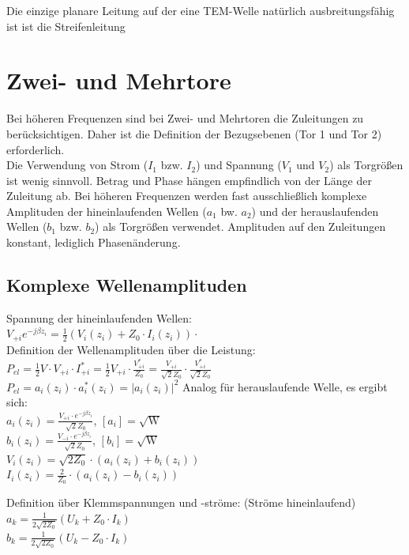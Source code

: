\documentclass[english]{latex4ei/latex4ei_sheet}
\begin{document}
\begin{sectionbox}
Die einzige planare Leitung auf der eine TEM-Welle natürlich ausbreitungsfähig ist ist die Streifenleitung

\end{sectionbox}

\section{Zwei- und Mehrtore}
\begin{sectionbox}
Bei höheren Frequenzen sind bei Zwei- und Mehrtoren die Zuleitungen zu berücksichtigen. Daher ist die Definition der Bezugsebenen (Tor 1 und Tor 2) erforderlich.\\
Die Verwendung von Strom ($I_1$ bzw. $I_2$) und Spannung ($V_1$ und $V_2$) als Torgrößen ist wenig sinnvoll. Betrag und Phase hängen empfindlich von der Länge der Zuleitung ab.
Bei höheren Frequenzen werden fast ausschließlich komplexe Amplituden der hineinlaufenden Wellen ($a_1$ bw. $a_2$) und der herauslaufenden Wellen ($b_1$ bzw. $b_2$) als Torgrößen verwendet. Amplituden auf den Zuleitungen konstant, lediglich Phasenänderung.
\end{sectionbox}
\begin{sectionbox}
	\subsection{Komplexe Wellenamplituden}
	Spannung der hineinlaufenden Wellen:\\
	$V_{+i}e^{-j\beta z_i} = \frac{1}{2}(V_i(z_i) + Z_0 \cdot I_i(z_i))\cdot $\\
	Definition der Wellenamplituden über die Leistung:\\
	$P_{el} = \frac{1}{2}V\cdot V_{+i} \cdot I_{+i}^* = \frac{1}{2}V_{+i}\cdot \frac{V_{+i}^*}{Z_0} = \frac{V_{+i}}{\sqrt{2} Z_0}\cdot\frac{V_{+i}^*}{\sqrt{2} Z_0}$\\
	
	$P_{el} = a_i(z_i)\cdot a_i^*(z_i) = |a_i(z_i)|^2$
	Analog für herauslaufende Welle, es ergibt sich:\\
	$a_i(z_i) = \frac{V_{+i}\cdot e^{-j\beta z_i}}{\sqrt{2}Z_0}$, \qquad $[a_i] = \sqrt{\text{W}}$\\
	
	$b_i(z_i) = \frac{V_{-i}\cdot e^{-j\beta z_i}}{\sqrt{2}Z_0}$, \qquad $[b_i] = \sqrt{\text{W}}$\\
	
	$V_i(z_i) = \sqrt{2Z_0} \cdot (a_i(z_i) + b_i(z_i))$\\
	$I_i(z_i) = \frac{2}{Z_0} \cdot (a_i(z_i) - b_i(z_i))$
	
	Definition über Klemmspannungen und -ströme: (Ströme hineinlaufend)\\
	$a_{k}=\frac{1}{2 \sqrt{2 Z_{0}}}\left(U_{k}+Z_{0} \cdot I_{k}\right)$\\
	$b_{k}=\frac{1}{2 \sqrt{2 Z_{0}}}\left(U_{k}-Z_{0} \cdot I_{k}\right)$
\end{sectionbox}
\end{document}
